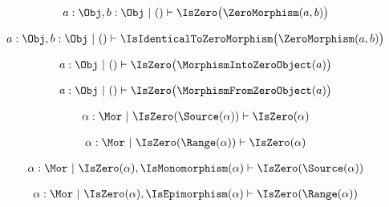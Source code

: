\begin{sequent}
\begin{align*}
   a: \Obj, b: \Obj ~|~ () \vdash \IsZero \big( \ZeroMorphism( a, b ) \big)
\end{align*}
\end{sequent}

\begin{sequent}
\begin{align*}
   a: \Obj, b: \Obj ~|~ () \vdash \IsIdenticalToZeroMorphism \big( \ZeroMorphism( a, b ) \big)
\end{align*}
\end{sequent}

\begin{sequent}
\begin{align*}
   a: \Obj ~|~ () \vdash \IsZero \big( \MorphismIntoZeroObject( a ) \big)
\end{align*}
\end{sequent}

\begin{sequent}
\begin{align*}
   a: \Obj ~|~ () \vdash \IsZero \big( \MorphismFromZeroObject( a ) \big)
\end{align*}
\end{sequent}

\begin{sequent}
\begin{align*}
   \alpha: \Mor ~|~ \IsZero(\Source(\alpha)) \vdash \IsZero(\alpha)
\end{align*}
\end{sequent}

\begin{sequent}
\begin{align*}
   \alpha: \Mor ~|~ \IsZero(\Range(\alpha)) \vdash \IsZero(\alpha)
\end{align*}
\end{sequent}

\begin{sequent}
\begin{align*}
   \alpha: \Mor ~|~ \IsZero(\alpha), \IsMonomorphism(\alpha) \vdash \IsZero(\Source(\alpha))
\end{align*}
\end{sequent}

\begin{sequent}
\begin{align*}
   \alpha: \Mor ~|~ \IsZero(\alpha), \IsEpimorphism(\alpha) \vdash \IsZero(\Range(\alpha))
\end{align*}
\end{sequent}

